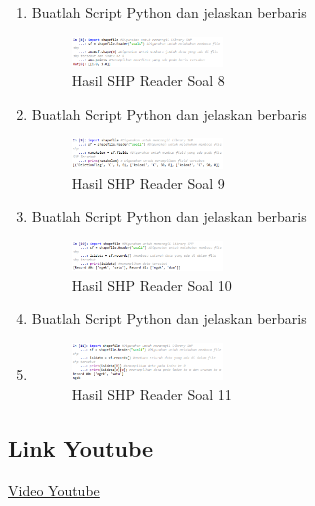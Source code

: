 \begin{enumerate}
    \item Buatlah Script Python dan jelaskan berbaris
    
    \hfill\break
    \begin{figure}[H]
		\includegraphics[width=4cm]{figures/1174002/3/soal8.png}
		\centering
		\caption{Hasil SHP Reader Soal 8}
    \end{figure}

    \item Buatlah Script Python dan jelaskan berbaris
    
    \hfill\break
    \begin{figure}[H]
		\includegraphics[width=4cm]{figures/1174002/3/soal9.png}
		\centering
		\caption{Hasil SHP Reader Soal 9}
    \end{figure}

    \item Buatlah Script Python dan jelaskan berbaris
    
    \hfill\break
    \begin{figure}[H]
		\includegraphics[width=4cm]{figures/1174002/3/soal10.png}
		\centering
		\caption{Hasil SHP Reader Soal 10}
    \end{figure}

    \item Buatlah Script Python dan jelaskan berbaris
    \item 
    \hfill\break
    \begin{figure}[H]
		\includegraphics[width=4cm]{figures/1174002/3/soal11.png}
		\centering
		\caption{Hasil SHP Reader Soal 11}
    \end{figure}
\end{enumerate}
\subsection{Link Youtube}
\href{https://youtu.be/Y7p5S5ETFVo}{Video Youtube}